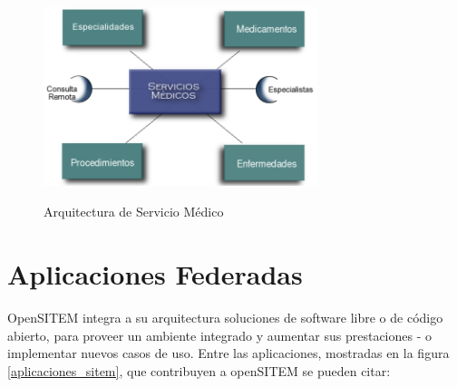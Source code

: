\begin{figure}
 \centering
 \includegraphics[width=80mm, height=60mm]{servicios.png}
 \caption{Arquitectura de Servicio Médico}
 \label{servicios}
\end{figure}

\section{Aplicaciones Federadas} 

OpenSITEM integra a su arquitectura soluciones de software libre o de código abierto, para proveer un ambiente integrado y aumentar sus prestaciones - o implementar nuevos casos de uso. Entre las aplicaciones, mostradas en la figura \ref{aplicaciones_sitem}, que contribuyen a openSITEM se pueden citar:

